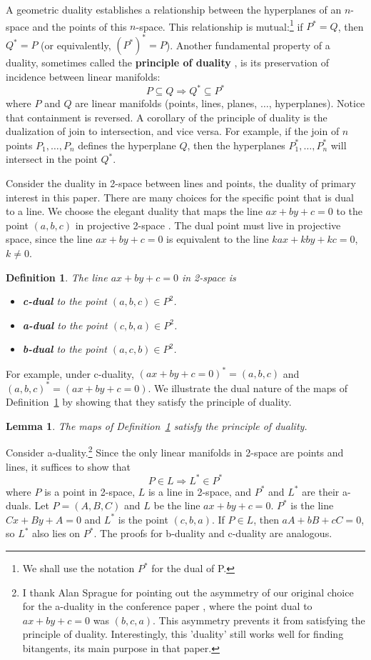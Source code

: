 \documentclass[12pt]{article}
\newcommand{\QED}{\vrule height 1.4ex width 1.0ex depth -.1ex\ \vspace{.3in}} %
\newcommand{\prf}{\noindent{{\bf Proof}:\ \ \ }}
\newtheorem{lemma}[theorem]{Lemma}
\newtheorem{defn2}[theorem]{Definition}
\begin{document}
A geometric duality establishes a relationship between the hyperplanes 
of an $n$-space and the points of this $n$-space.
This relationship is mutual:\footnote{We shall use the notation $P^*$ for the dual of P.} 
if $P^* = Q$, then $Q^* = P$ (or equivalently, $(P^*)^* = P$).
Another fundamental property of a duality,
sometimes called the {\bf principle of duality} \cite{pedoe70}, %
is its preservation of incidence between linear manifolds:
\[
P \subseteq Q \Rightarrow Q^* \subseteq P^*
\]
where $P$ and $Q$ are linear manifolds (points, lines, planes, $\ldots$, hyperplanes).  %
Notice that containment is reversed.
A corollary of the principle of duality is the dualization of join to intersection, and vice versa.
For example, if the join of $n$ points $P_1, \ldots, P_n$ defines the hyperplane $Q$,
then the hyperplanes $P_1^*, \ldots, P_n^*$ will intersect in the point $Q^*$.

Consider the duality  in 2-space between lines and points,
the duality of primary interest in this paper.
There are many choices for the specific point that is dual to a line.
We choose the elegant duality that maps
the line $ax+by+c=0$ to the point $(a,b,c)$ in projective 2-space \cite{hartshorne77}.
The dual point must live in projective space,
since the line $ax + by + c = 0$ is equivalent to the line
$kax + kby + kc = 0$, $k \neq 0$.

\begin{defn2}
\label{defn:dual}
The line $ax+by+c=0$ in 2-space is 
\begin{itemize}
\item	{\bf c-dual} to the point $(a,b,c) \in P^2$.
\item   {\bf a-dual} to the point $(c,b,a) \in P^2$.
\item   {\bf b-dual} to the point $(a,c,b) \in P^2$.
\end{itemize}
\end{defn2}

For example, under c-duality, $(ax+by+c=0)^* = (a,b,c)$
and $(a,b,c)^* = (ax+by+c=0)$.
We illustrate the dual nature of the maps of Definition~\ref{defn:dual} by showing
that they satisfy the principle of duality.

\begin{lemma}
The maps of Definition~\ref{defn:dual} 
satisfy the principle of duality.
\end{lemma}
\prf
Consider a-duality.\footnote{I thank Alan Sprague for pointing out 
	the asymmetry of our original choice for the a-duality in the 
	conference paper \cite{jj01a}, 	where the point dual to $ax+by+c=0$ was $(b,c,a)$.
	This asymmetry prevents it from satisfying the principle of duality.
	Interestingly, this 'duality' still works
	well for finding bitangents, its main purpose in that paper.}
Since the only linear manifolds in 2-space are points and lines,
it suffices to show that 
\[	P \in L \Rightarrow L^* \in P^*
\]
where $P$ is a point in 2-space, $L$ is a line in 2-space, 
and $P^*$ and $L^*$ are their a-duals.
Let $P=(A,B,C)$ and $L$ be the line $ax+by+c=0$.
$P^*$ is the line $Cx+By+A=0$ and $L^*$ is the point $(c,b,a)$.
If $P \in L$, then $aA+bB+cC=0$,
so $L^*$ also lies on $P^*$.
The proofs for b-duality and c-duality are analogous.
\QED
\end{document}
